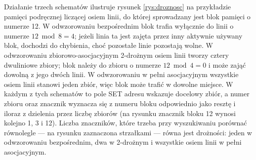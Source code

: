 \documentclass[a4paper,12pt]{book} %
\begin{document}
Działanie trzech schematów ilustruje rysunek \ref{rys:droznosc} na przykładzie pamięci podręcznej liczącej osiem linii, do której sprowadzany jest blok pamięci o numerze 12. W odwzorowaniu bezpośrednim blok trafia wyłącznie do linii o numerze $12 \bmod 8 = 4$; jeżeli linia ta jest zajęta przez inny aktywnie używany blok, dochodzi do chybienia, choć pozostałe linie pozostają wolne. W odwzorowaniu zbiorowo-asocjacyjnym 2-drożnym osiem linii tworzy cztery dwuliniowe zbiory; blok należy do zbioru o numerze $12 \bmod 4 = 0$ i może zająć dowolną z jego dwóch linii. W odwzorowaniu w pełni asocjacyjnym wszystkie osiem linii stanowi jeden zbiór, więc blok może trafić w dowolne miejsce. W każdym z tych schematów to pole SET adresu wskazuje docelowy zbiór, a numer zbioru oraz znacznik wyznacza się z numeru bloku odpowiednio jako resztę i iloraz z dzielenia przez liczbę zbiorów (na rysunku znacznik bloku 12 wynosi kolejno 1, 3 i 12). Liczba znaczników, które trzeba przy wyszukiwaniu porównać równolegle --- na rysunku zaznaczona strzałkami --- równa jest drożności: jeden w odwzorowaniu bezpośrednim, dwa w 2-drożnym i wszystkie osiem linii w pełni asocjacyjnym.
\end{document}
